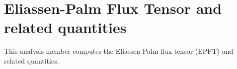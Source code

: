 \section{Eliassen-Palm Flux Tensor and related quantities}
\label{sec:AM_eliassen_palm}

This analysis member computes the Eliassen-Palm flux tensor (EPFT) and related quantities.

